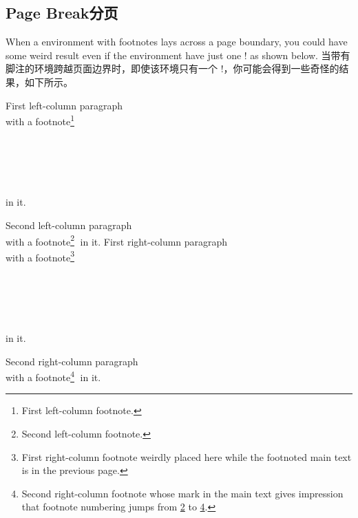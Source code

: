 \subsection{Page Break\hfill 分页}
\label{sec:fnnp-pbreak}
\begin{paracol}{2}
When a  environment with footnotes lays across a page boundary,
you could have some weird result even if the environment have just one
\!\switchcolumn! as shown below.
\switchcolumn
当带有脚注的环境跨越页面边界时，即使该环境只有一个 \!\switchcolumn!，你可能会得到一些奇怪的结果，如下所示。
\end{paracol}
\Hrule
\begin{paracol}{2}
First left-column paragraph \Dotfill\\
\Dotfill with a footnote\footnote{First left-column
footnote.\label{fn:6L1}}\Dotfill\\
\Dotfill\\ \Dotfill\\ \Dotfill\\ \Dotfill\\ \Dotfill\\
\Dotfill in it.
\par
Second left-column paragraph \Dotfill\\
\Dotfill with a footnote\footnote{Second left-column
footnote.\label{fn:6L2}}
\Dotfill in it.
\switchcolumn
First right-column paragraph \Dotfill\\
\Dotfill with a footnote\footnote{First right-column
footnote weirdly placed here while the footnoted main text is in the
previous page.\label{fn:6R1}}\Dotfill\\
\Dotfill\\ \Dotfill\\ \Dotfill\\ \Dotfill\\ \Dotfill\\
\Dotfill in it.
\par
Second right-column paragraph \Dotfill\\
\Dotfill with a footnote\footnote{Second right-column
footnote whose mark in the main text gives impression that footnote
numbering jumps from \ref{fn:6L2} to \ref{fn:6R2}.\label{fn:6R2}}
\Dotfill in it.
\end{paracol}
\Hrule

